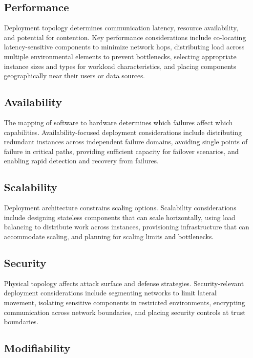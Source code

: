 \documentclass[11pt]{article}
\begin{document}
\subsection{Performance}

Deployment topology determines communication latency, resource availability, and potential for contention. Key performance considerations include co-locating latency-sensitive components to minimize network hops, distributing load across multiple environmental elements to prevent bottlenecks, selecting appropriate instance sizes and types for workload characteristics, and placing components geographically near their users or data sources.

\subsection{Availability}

The mapping of software to hardware determines which failures affect which capabilities. Availability-focused deployment considerations include distributing redundant instances across independent failure domains, avoiding single points of failure in critical paths, providing sufficient capacity for failover scenarios, and enabling rapid detection and recovery from failures.

\subsection{Scalability}

Deployment architecture constrains scaling options. Scalability considerations include designing stateless components that can scale horizontally, using load balancing to distribute work across instances, provisioning infrastructure that can accommodate scaling, and planning for scaling limits and bottlenecks.

\subsection{Security}

Physical topology affects attack surface and defense strategies. Security-relevant deployment considerations include segmenting networks to limit lateral movement, isolating sensitive components in restricted environments, encrypting communication across network boundaries, and placing security controls at trust boundaries.

\subsection{Modifiability}
\end{document}
